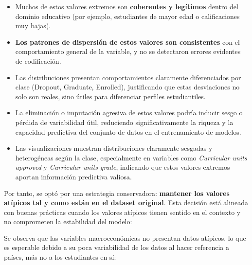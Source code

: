 \documentclass{report}[14pt]
\begin{document}
\begin{itemize}
    \item Muchos de estos valores extremos son \textbf{coherentes y legítimos} dentro del dominio educativo (por ejemplo, estudiantes de mayor edad o calificaciones muy bajas).
    \item \textbf{Los patrones de dispersión de estos valores son consistentes} con el comportamiento general de la variable, y no se detectaron errores evidentes de codificación.
    \item Las distribuciones presentan comportamientos claramente diferenciados por clase (Dropout, Graduate, Enrolled), justificando que estas desviaciones no solo son reales, sino útiles para diferenciar perfiles estudiantiles.
    \item La eliminación o imputación agresiva de estos valores podría inducir sesgo o pérdida de variabilidad útil, reduciendo significativamente la riqueza y la capacidad predictiva del conjunto de datos en el entrenamiento de modelos.
    \item Las visualizaciones muestran distribuciones claramente sesgadas y heterogéneas según la clase, especialmente en variables como \textit{Curricular units approved} y \textit{Curricular units grade}, indicando que estos valores extremos aportan información predictiva valiosa.
\end{itemize}

Por tanto, se optó por una estrategia conservadora: \textbf{mantener los valores atípicos tal y como están en el dataset original}. Esta decisión está alineada con buenas prácticas cuando los valores atípicos tienen sentido en el contexto y no comprometen la estabilidad del modelo:


Se observa que las variables macroeconómicas no presentan datos atípicos, lo que es esperable debido a su poca variabilidad de los datos al hacer referencia a países, más no a los estudiantes en sí: 
\end{document}
